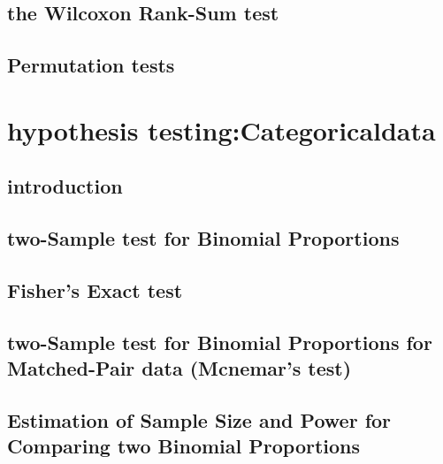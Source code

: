 \documentclass[12pt,]{article}
\begin{document}
\hypertarget{the-wilcoxon-rank-sum-test}{%
\subsection{the Wilcoxon Rank-Sum
test}\label{the-wilcoxon-rank-sum-test}}

\hypertarget{permutation-tests}{%
\subsection{Permutation tests}\label{permutation-tests}}

\hypertarget{hypothesis-testingcategoricaldata}{%
\section{hypothesis
testing:Categoricaldata}\label{hypothesis-testingcategoricaldata}}

\hypertarget{introduction-6}{%
\subsection{introduction}\label{introduction-6}}

\hypertarget{two-sample-test-for-binomial-proportions}{%
\subsection{two-Sample test for Binomial
Proportions}\label{two-sample-test-for-binomial-proportions}}

\hypertarget{fishers-exact-test}{%
\subsection{Fisher's Exact test}\label{fishers-exact-test}}

\hypertarget{two-sample-test-for-binomial-proportions-for-matched-pair-data-mcnemars-test}{%
\subsection{two-Sample test for Binomial Proportions for Matched-Pair
data (Mcnemar's
test)}\label{two-sample-test-for-binomial-proportions-for-matched-pair-data-mcnemars-test}}

\hypertarget{estimation-of-sample-size-and-power-for-comparing-two-binomial-proportions}{%
\subsection{Estimation of Sample Size and Power for Comparing two
Binomial
Proportions}\label{estimation-of-sample-size-and-power-for-comparing-two-binomial-proportions}}
\end{document}
